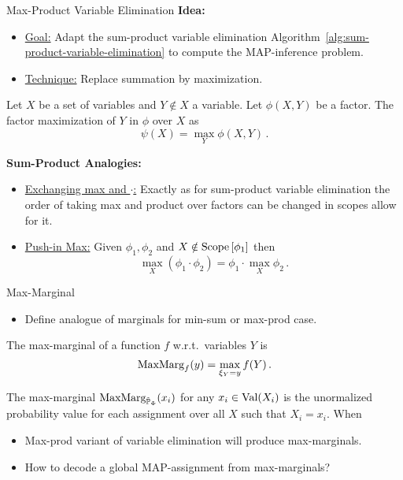 \begin{frame}{Max-Product Variable Elimination}
\textbf{Idea:}
\begin{itemize}
    \item \underline{Goal:} Adapt the sum-product variable elimination Algorithm~\ref{alg:sum-product-variable-elimination} to compute the MAP-inference problem.
    \pause \item \underline{Technique:} Replace summation by maximization.
\end{itemize}
\pause
\begin{definition}
    Let $X$ be a set of variables and $Y \notin X$ a variable. Let $\phi(X,Y)$ be a factor. The factor maximization of $Y$ in $\phi$ over $X$ as
    \begin{equation}
        \psi(X) = \max_{Y} \phi(X,Y)\,.
    \end{equation}
\end{definition}
\pause
\textbf{Sum-Product Analogies:}
\begin{itemize}
    \item \underline{Exchanging max and $\cdot$:} Exactly as for sum-product variable elimination the order of taking max and product over factors can be changed in scopes allow for it.
    \pause \item \underline{Push-in Max:} Given $\phi_1,\phi_2$ and $X \notin \Scope[\phi_1]$ then
    \begin{equation}
        \max_X (\phi_1 \cdot \phi_2) = \phi_1 \cdot \max_X \phi_2\,.
    \end{equation}
\end{itemize}
\end{frame}

\begin{frame}{Max-Marginal}
    \begin{itemize}
        \item Define analogue of marginals for min-sum or max-prod case.
    \end{itemize}
    \pause
\begin{definition}
   The max-marginal of a function $f$ w.r.t.\ variables $Y$ is 
   \begin{equation}
    \text{MaxMarg}_{f}(y) = \max_{\xi_{Y} = y} f(Y)\,.
   \end{equation}
\end{definition}
    \pause
\begin{example}
    The max-marginal $\maxmarg_{\tilde{\Pb}_{\Phi}}(x_i)$ for any $x_i \in \text{Val}(X_i)$ is the unormalized probability value for each assignment over all $X$ such that $X_i = x_i$.
    When
    \\
\end{example}
    \begin{itemize}
        \pause \item Max-prod variant of variable elimination will produce max-marginals.
        \pause \item How to decode a global MAP-assignment from max-marginals?
        \end{itemize}
\end{frame}

